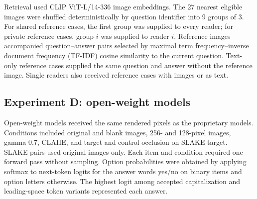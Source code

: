 Retrieval used CLIP ViT-L/14-336 image embeddings.
The 27 nearest eligible images were shuffled deterministically by question identifier into 9 groups of 3.
For shared reference cases, the first group was supplied to every reader; for private reference cases, group $i$ was supplied to reader $i$.
Reference images accompanied question--answer pairs selected by maximal term frequency--inverse document frequency (TF-IDF) cosine similarity to the current question.
Text-only reference cases supplied the same question and answer without the reference image.
Single readers also received reference cases with images or as text.

\subsection{Experiment D: open-weight models}
Open-weight models received the same rendered pixels as the proprietary models.
Conditions included original and blank images, 256- and 128-pixel images, gamma 0.7, CLAHE, and target and control occlusion on SLAKE-target.
SLAKE-pairs used original images only.
Each item and condition required one forward pass without sampling.
Option probabilities were obtained by applying softmax to next-token logits for the answer words yes/no on binary items and option letters otherwise.
The highest logit among accepted capitalization and leading-space token variants represented each answer.

